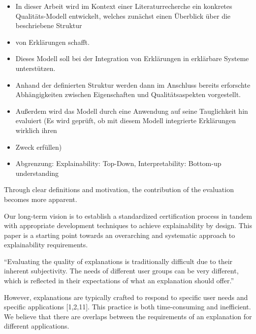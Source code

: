 \begin{itemize}
    \item In dieser Arbeit wird im Kontext einer Literaturrecherche ein konkretes Qualitäts-Modell entwickelt, welches zunächst einen Überblick über die beschriebene Struktur     \item von Erklärungen schafft.
    \item Dieses Modell soll bei der Integration von Erklärungen in erklärbare Systeme unterstützen.
    \item Anhand der definierten Struktur werden dann im Anschluss bereits erforschte Abhängigkeiten zwischen Eigenschaften und Qualitätsaspekten vorgestellt.
    \item Außerdem wird das Modell durch eine Anwendung auf seine Tauglichkeit hin evaluiert (Es wird geprüft, ob mit diesem Modell integrierte Erklärungen wirklich ihren     \item Zweck erfüllen)
    \item Abgrenzung: Explainability: Top-Down, Interpretability: Bottom-up understanding \cite{thomson_knowledge--information_2020}
\end{itemize}


















\glqq Through clear definitions and motivation, the contribution of the evaluation becomes more apparent. \grqq{} \cite{waa_evaluating_2021}

Our long-term vision is to establish a standardized certification process in tandem with appropriate development techniques to achieve explainability by design. This paper is a starting point towards an overarching and systematic approach to explainability requirements.

“Evaluating the quality of explanations is traditionally difficult due to their inherent subjectivity. The needs of different user groups can be very different, which is reflected in their expectations of what an explanation should offer.” \cite{martin_developing_2019, martin_evaluating_2021}

However, explanations are typically crafted to respond to specific user needs and specific applications [1,2,11]. This practice is both time-consuming and inefficient. We believe that there are overlaps between the requirements of an explanation for different applications. \cite{martin_developing_2019}

